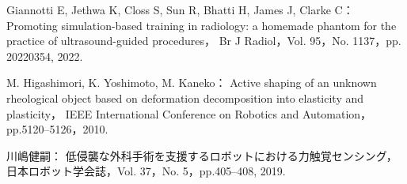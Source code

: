 \documentclass[a4paper]{jarticle}
\begin{document}
\begin{thebibliography}{9}

    Giannotti E, Jethwa K, Closs S, Sun R, Bhatti H, James J, Clarke C：
    Promoting simulation-based training in radiology: a homemade phantom for the practice of ultrasound-guided procedures，
    Br J Radiol，Vol. 95，No. 1137，pp. 20220354, 2022.

    M. Higashimori, K. Yoshimoto, M. Kaneko：
    Active shaping of an unknown rheological object based on deformation decomposition into elasticity and plasticity，
    IEEE International Conference on Robotics and Automation，pp.5120–5126，2010.

    川嶋健嗣： 
    低侵襲な外科手術を支援するロボットにおける力触覚センシング，
    日本ロボット学会誌，Vol. 37，No. 5，pp.405–408, 2019.

\end{thebibliography}


\clearpage
\end{document}
